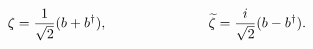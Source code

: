 \begin{equation}
\zeta=\frac{1}{\sqrt{2}}(b+b^{\dagger}), \hspace{1.0in}
{\widetilde \zeta}=\frac{i}{\sqrt{2}}(b-b^{\dagger}).
\end{equation}

